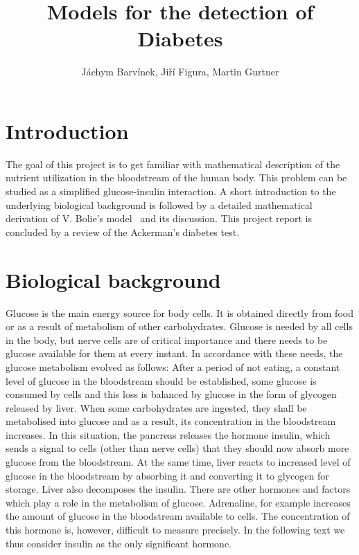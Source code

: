 \documentclass{article}
\begin{document}
\title{Models for the detection of Diabetes}
\author{J\'achym Barv\'inek, Ji\v r\'i Figura, Martin Gurtner}

\maketitle

\section{Introduction}

The goal of this project is to get familiar with mathematical description of the nutrient utilization in the bloodstream of the human body. This problem can be studied as a simplified glucose-insulin interaction.
A short introduction to the underlying biological background is followed by a detailed mathematical derivation of V. Bolie's model~\cite{bolie1961coefficients} and its discussion. This project report is concluded by a review of the Ackerman's diabetes test. 

\section{Biological background}

Glucose is the main energy source for body cells. It is obtained directly from food or as a result of metabolism of other carbohydrates. Glucose is needed by all cells in the body, but nerve cells are of critical importance and there needs
to be glucose available for them at every instant. In accordance with these needs, the glucose
metabolism evolved as follows:
After a period of not eating, a constant level of glucose in the bloodstream should be established,
some glucose is consumed by cells and this loss is balanced by glucose in the form of glycogen
released by liver. When some carbohydrates are ingested, they shall be metabolised into glucose
and as a result, its concentration in the bloodstream increases. In this situation, the pancreas
releases the hormone insulin, which sends a signal to cells (other than nerve cells) that they should
now absorb more glucose from the bloodstream. At the same time, liver reacts to increased level of 
glucose in the bloodstream by absorbing it and converting it to glycogen for storage. Liver also 
decomposes the insulin. There are other hormones and factors which play a role in the metabolism
of glucose. Adrenaline, for example increases the amount of glucose in the bloodstream available
to cells. The concentration of this hormone is, however, difficult to measure precisely.
In the following text we thus consider insulin as the only significant hormone.
\end{document}
